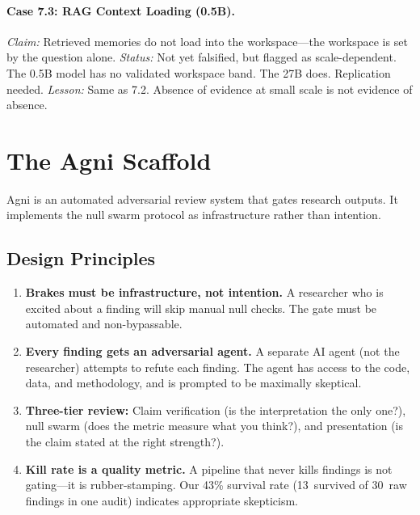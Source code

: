 \documentclass[11pt,a4paper]{article}
\begin{document}
\paragraph{Case 7.3: RAG Context Loading (0.5B).}
\emph{Claim:} Retrieved memories do not load into the workspace---the
workspace is set by the question alone.
\emph{Status:} Not yet falsified, but flagged as scale-dependent. The
0.5B model has no validated workspace band. The 27B does. Replication
needed.
\emph{Lesson:} Same as 7.2. Absence of evidence at small scale is not
evidence of absence.

\section{The Agni Scaffold}
\label{sec:agni}

Agni is an automated adversarial review system that gates research
outputs. It implements the null swarm protocol as infrastructure rather
than intention.

\subsection{Design Principles}

\begin{enumerate}[nosep]
    \item \textbf{Brakes must be infrastructure, not intention.} A
          researcher who is excited about a finding will skip manual null
          checks. The gate must be automated and non-bypassable.

    \item \textbf{Every finding gets an adversarial agent.} A separate AI
          agent (not the researcher) attempts to refute each finding. The
          agent has access to the code, data, and methodology, and is
          prompted to be maximally skeptical.

    \item \textbf{Three-tier review:} Claim verification (is the
          interpretation the only one?), null swarm (does the metric
          measure what you think?), and presentation (is the claim stated
          at the right strength?).

    \item \textbf{Kill rate is a quality metric.} A pipeline that never
          kills findings is not gating---it is rubber-stamping. Our 43\%
          survival rate (13~survived of 30~raw findings in one audit)
          indicates appropriate skepticism.
\end{enumerate}
\end{document}
